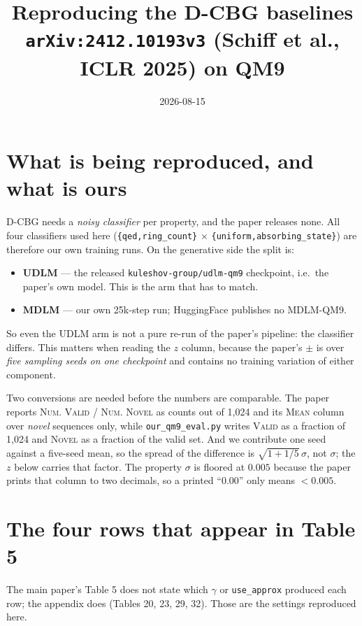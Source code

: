 \documentclass[11pt]{article}
\title{Reproducing the D-CBG baselines\\\large \texttt{arXiv:2412.10193v3} (Schiff et al., ICLR 2025) on QM9}
\author{}\date{2026-08-15}
\begin{document}
\maketitle
\section{What is being reproduced, and what is ours}

D-CBG needs a \emph{noisy classifier} per property, and the paper releases none.
All four classifiers used here (\texttt{\{qed,ring\_count\}} $\times$
\texttt{\{uniform,absorbing\_state\}}) are therefore our own training runs. On the
generative side the split is:

\begin{itemize}
  \item \textbf{UDLM} --- the released \texttt{kuleshov-group/udlm-qm9}
        checkpoint, i.e.\ the paper's own model. This is the arm that has to
        match.
  \item \textbf{MDLM} --- our own 25k-step run; HuggingFace publishes no
        MDLM-QM9.
\end{itemize}

So even the UDLM arm is not a pure re-run of the paper's pipeline: the
classifier differs. This matters when reading the $z$ column, because the
paper's $\pm$ is over \emph{five sampling seeds on one checkpoint} and contains
no training variation of either component.

Two conversions are needed before the numbers are comparable. The paper reports
\textsc{Num. Valid} / \textsc{Num. Novel} as counts out of 1{,}024 and its
\textsc{Mean} column over \emph{novel} sequences only, while
\texttt{our\_qm9\_eval.py} writes \textsc{Valid} as a fraction of 1{,}024 and
\textsc{Novel} as a fraction of the valid set. And we contribute one seed against
a five-seed mean, so the spread of the difference is
$\sqrt{1+1/5}\,\sigma$, not $\sigma$; the $z$ below carries that factor.
The property $\sigma$ is floored at $0.005$ because the paper prints that column
to two decimals, so a printed ``$0.00$'' only means $<0.005$.

\section{The four rows that appear in Table 5}

The main paper's Table 5 does not state which $\gamma$ or \texttt{use\_approx}
produced each row; the appendix does (Tables 20, 23, 29, 32). Those are the
settings reproduced here.
\end{document}

